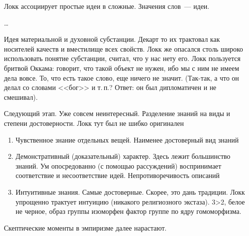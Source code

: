 Локк ассоциирует простые идеи в сложные. Значения слов~--- идеи.

\ldots

Идея материальной и духовной субстанции. Декарт то их трактовал как носителей качеств и вместилище всех свойств. Локк же опасался столь широко использовать понятие субстанции, считал, что у нас нету его. Локк пользуется бритвой Оккама: говорит, что такой объект не нужен, ибо мы с ним не имеем дела вовсе. То, что есть такое слово, еще ничего не значит. (Так-так, а что он делал со словами <<бог>> и т.\,п.? Ответ: он был дипломатичен и не смешивал). 

Следующий этап. Уже совсем неинтересный. Разделение знаний на виды и степени достоверности. Локк тут был не шибко оригинален

\begin{enumerate}
	\item Чувственное знание отдельных вещей. Наименее достоверный вид знаний
	\item Демонстративный (доказательный) характер. Здесь лежит большинство знаний. Ум опосредованно (с помощью рассуждений) воспринимает соответствие и несоответствие идей. Непротиворечивость описаний
	\item Интуитивные знания. Самые достоверные. Скорее, это дань традиции. Локк упрощенно трактует интуицию (никакого религиозного экстаза). 3>2, белое не черное, образ группы изоморфен фактор группе по ядру гомоморфизма.
\end{enumerate}
	
Скептические моменты в эмпиризме далее нарастают.
